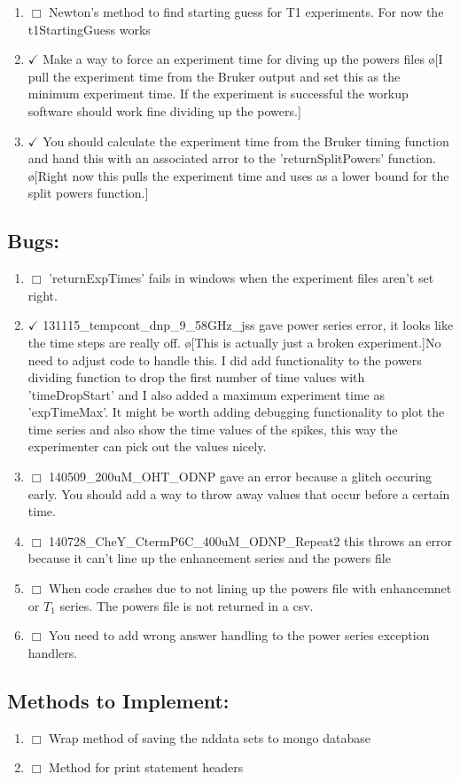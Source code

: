 \documentclass[10pt]{book}
\begin{document}
\begin{enumerate}
    \item $\Box$ Newton's method to find starting guess for T1 experiments. For now the t1StartingGuess works 
    \item $\checkmark$ Make a way to force an experiment time for diving up the powers files \o[I pull the experiment time from the Bruker output and set this as the minimum experiment time. If the experiment is successful the workup software should work fine dividing up the powers.]{}
    \item $\checkmark$ You should calculate the experiment time from the Bruker timing function and hand this with an associated arror to the 'returnSplitPowers' function. \o[Right now this pulls the experiment time and uses as a lower bound for the split powers function.]{}
\end{enumerate}
\subsection{Bugs:}
\begin{enumerate}
    \item $\Box$ 'returnExpTimes' fails in windows when the experiment files aren't set right.
    \item $\checkmark$ 131115_tempcont_dnp_9_58GHz_jss gave power series error, it looks like the time steps are really off. \o[This is actually just a broken experiment.]{No need to adjust code to handle this. I did add functionality to the powers dividing function to drop the first number of time values with 'timeDropStart' and I also added a maximum experiment time as 'expTimeMax'. It might be worth adding debugging functionality to plot the time series and also show the time values of the spikes, this way the experimenter can pick out the values nicely.}
    \item $\Box$ 140509_200uM_OHT_ODNP gave an error because a glitch occuring early. You should add a way to throw away values that occur before a certain time.
    \item $\Box$ 140728_CheY_CtermP6C_400uM_ODNP_Repeat2 this throws an error because it can't line up the enhancement series and the powers file
    \item $\Box$ When code crashes due to not lining up the powers file with enhancemnet or $T_1$ series. The powers file is not returned in a csv.
    \item $\Box$ You need to add wrong answer handling to the power series exception handlers.
\end{enumerate}
\subsection{Methods to Implement:}
\begin{enumerate}
    \item $\Box$ Wrap method of saving the nddata sets to mongo database
    \item $\Box$ Method for print statement headers
\end{enumerate}
\end{document}
